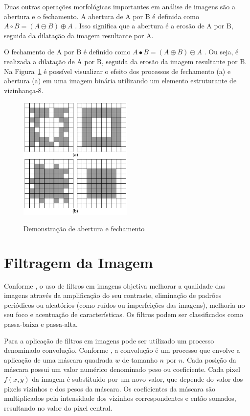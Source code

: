 \documentclass[12pt,oneside,a4paper,english,french,spanish,brazil,]{abntex2}
\begin{document}
Duas outras operações morfológicas importantes em análise de imagens são a abertura e o fechamento. A abertura de A por B é definida como \(A \circ  B = (A \ominus B) \oplus A\) \cite{pedrini:2008}. Isso significa que a abertura é a erosão de A por B, seguida da dilatação da imagem resultante por A.

O fechamento de A por B é definido como \(A \bullet  B = (A \oplus B) \ominus A\) \cite{pedrini:2008}. Ou seja, é realizada a dilatação de A por B, seguida da erosão da imagem resultante por B.
Na Figura~\ref{fig:PDI_Abertura_Fechamento_1} é possível visualizar o efeito dos processos de fechamento (a) e abertura (a) em uma imagem binária utilizando um elemento estruturante de vizinhança-8.

\begin{figure}[ht]
\centering
\caption{Demonstração de abertura e fechamento}
\includegraphics[width=0.5\textwidth]{imagens/PDI_Abertura_Fechamento_1.pdf}
\sourceAuthor
\label{fig:PDI_Abertura_Fechamento_1}
\end{figure}

\section{Filtragem da Imagem}

Conforme \citet{conci:2003}, o uso de filtros em imagens objetiva melhorar a qualidade das imagens através da amplificação do seu contraste, eliminação de padrões periódicos ou aleatórios (como ruídos ou imperfeições das imagens), melhoria no seu foco e acentuação de características. Os filtros podem ser classificados como passa-baixa e passa-alta.
	
Para a aplicação de filtros em imagens pode ser utilizado um processo denominado convolução. Conforme \cite{pedrini:2008}, a convolução é um processo que envolve a aplicação de uma máscara quadrada \(w\) de tamanho \(n\) por \(n\). Cada posição da máscara possui um valor numérico denominado peso ou coeficiente. Cada pixel \(f(x,y)\) da imagem é substituído por um novo valor, que depende do valor dos pixels vizinhos e dos pesos da máscara. Os coeficientes da máscara são multiplicados pela intensidade dos vizinhos correspondentes e então somados, resultando no valor do pixel central.
\end{document}
